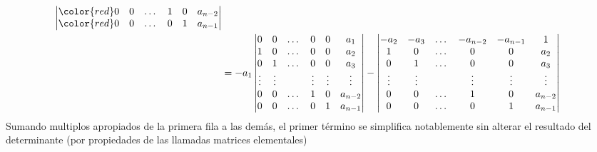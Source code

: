 \documentclass{report}
\theoremstyle{remark}
\begin{document}
\begin{align}
\begin{vmatrix}
        \color{red} 0
        &0
        &\dots
        &1
        &0
        &a_{n - 2}
        \\
        \color{red} 0
        &0
        &\dots
        &0
        &1
        &a_{n - 1}
      \end{vmatrix}
      \\
    &=
    - a_1
    \begin{vmatrix}
      0
      &0
      &\dots
      &0
      &0
      &a_1
      \\
      1
      &0
      &\dots
      &0
      &0
      &a_2
      \\
      0
      &1
      &\dots
      &0
      &0
      &a_3
      \\
      \vdots
      &\vdots
      &
      &\vdots
      &\vdots
      &\vdots
      \\
      0
      &0
      &\dots
      &1
      &0
      &a_{n - 2}
      \\
      0
      &0
      &\dots
      &0
      &1
      &a_{n - 1}
    \end{vmatrix}
    -
    \begin{vmatrix}
      - a_2
      &- a_3
      &\dots
      &- a_{n - 2}
      &- a_{n - 1}
      &1
      \\
      1
      &0
      &\dots
      &0
      &0
      &a_2
      \\
      0
      &1
      &\dots
      &0
      &0
      &a_3
      \\
      \vdots
      &\vdots
      &
      &\vdots
      &\vdots
      &\vdots
      \\
      0
      &0
      &\dots
      &1
      &0
      &a_{n - 2}
      \\
      0
      &0
      &\dots
      &0
      &1
      &a_{n - 1}
    \end{vmatrix}
  \end{align}
  \endgroup
  Sumando multiplos apropiados de la primera fila a las demás, el primer término se simplifica notablemente sin alterar el resultado del determinante (por propiedades de las llamadas matrices elementales)
\end{document}
